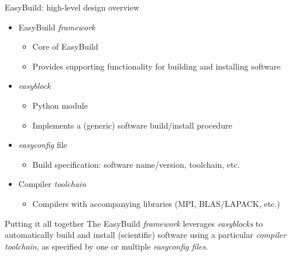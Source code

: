 \documentclass[10pt,xcolor={usenames,dvipsnames}]{beamer}
\begin{document}
\begin{frame}{EasyBuild: high-level design overview}
\begin{itemize}
    \item
        EasyBuild \emph{framework}
        \begin{itemize}
            \item
                Core of EasyBuild
            \item
                Provides supporting functionality for building and installing software
        \end{itemize}
    \item
        \emph{easyblock}
        \begin{itemize}
            \item
                Python module
            \item
                Implements a (generic) software build/install procedure
        \end{itemize}
    \item
        \emph{easyconfig} file
        \begin{itemize}
            \item
                Build specification: software name/version, toolchain, etc.
        \end{itemize}
    \item
        Compiler \emph{toolchain}
        \begin{itemize}
            \item
                Compilers with accompanying libraries (MPI, BLAS/LAPACK, etc.)
        \end{itemize}
\end{itemize}

\medskip\quad\quad
\begin{minipage}{0.9\textwidth}
    \begin{block}{\small Putting it all together}
        \footnotesize
        The EasyBuild \emph{framework} leverages \emph{easyblocks} to
        automatically build and install (scientific) software using a
        particular \emph{compiler toolchain}, as specified by one or multiple
        \emph{easyconfig files}.
    \end{block}
\end{minipage}
\end{frame}

\end{document}
